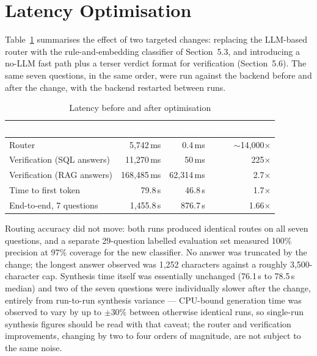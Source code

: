 \documentclass[11pt,a4paper,oneside]{report}
\begin{document}
\section{Latency Optimisation}

Table~\ref{tab:latency} summarises the effect of two targeted changes: replacing
the LLM-based router with the rule-and-embedding classifier of
Section~5.3, and introducing a no-LLM fast path plus a terser verdict format
for verification (Section~5.6). The same seven questions, in the same order,
were run against the backend before and after the change, with the backend
restarted between runs.

\begin{table}[h]
\centering
\caption{Latency before and after optimisation}
\label{tab:latency}
\renewcommand{\arraystretch}{1.3}
\begin{tabular}{|l|r|r|r|}
\hline
\rowcolor{hdrnavy}
\textcolor{white}{Stage} & \textcolor{white}{Before} &
\textcolor{white}{After} & \textcolor{white}{Improvement} \\
\hline
Router & 5{,}742\,ms & 0.4\,ms & $\sim$14{,}000$\times$ \\
\hline
Verification (SQL answers) & 11{,}270\,ms & 50\,ms & 225$\times$ \\
\hline
Verification (RAG answers) & 168{,}485\,ms & 62{,}314\,ms & 2.7$\times$ \\
\hline
Time to first token & 79.8\,s & 46.8\,s & 1.7$\times$ \\
\hline
\rowcolor{hdrblue}
End-to-end, 7 questions & 1{,}455.8\,s & 876.7\,s & 1.66$\times$ \\
\hline
\end{tabular}
\end{table}

Routing accuracy did not move: both runs produced identical routes on all
seven questions, and a separate 29-question labelled evaluation set measured
100\% precision at 97\% coverage for the new classifier. No answer was
truncated by the change; the longest answer observed was 1,252 characters
against a roughly 3,500-character cap. Synthesis time itself was essentially
unchanged (76.1\,s to 78.5\,s median) and two of the seven questions were
individually slower after the change, entirely from run-to-run synthesis
variance --- CPU-bound generation time was observed to vary by up to $\pm$30\%
between otherwise identical runs, so single-run synthesis figures should be
read with that caveat; the router and verification improvements, changing by
two to four orders of magnitude, are not subject to the same noise.
\end{document}
